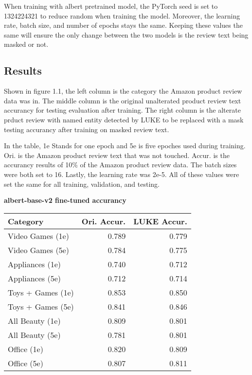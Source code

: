 \documentclass[11pt,a4paper]{article}
\begin{document}
When training with albert pretrained model, the PyTorch seed is set to 1324224321 to reduce random when training the model. Moreover, the learning rate, batch size, and number of epochs stays the same. Keeping these values the same will ensure the only change between the two models is the review text being masked or not.

\subsection{Results}

Shown in figure 1.1, the left column is the category the Amazon product review data was in. The middle column is the original unalterated product review text accurancy for testing evaluation after training. The right column is the alterate prduct review with named entity detected by LUKE to be replaced with a mask testing accurancy after training on masked review text.

In the table, 1e Stands for one epoch and 5e is five epoches used during training. Ori. is the Amazon product review text that was not touched. Accur. is the accurancy results of 10\% of the Amazon product review data. The batch sizes were both set to 16. Lastly, the learning rate was 2e-5. All of these values were set the same for all training, validation, and testing. \\

\begin{center}
\textbf{albert-base-v2 fine-tuned accurancy}
\noindent\begin{tabular}{|l|r|r|}
\hline
 Category & Ori. Accur. & LUKE Accur. \\
\hline
Video Games (1e)    & 0.789       & 0.779       \\
Video Games (5e)    & 0.784       & 0.775       \\
Appliances (1e)     & 0.740       & 0.712       \\
Appliances (5e)     & 0.712       & 0.714       \\
Toys + Games (1e)   & 0.853       & 0.850       \\
Toys + Games (5e)   & 0.841       & 0.846       \\
All Beauty (1e)     & 0.809       & 0.801       \\
All Beauty (5e)     & 0.781       & 0.801       \\
Office (1e)         & 0.820       & 0.809       \\
Office (5e)         & 0.807       & 0.811       \\
\hline
\end{tabular}
\end{center}
\end{document}

